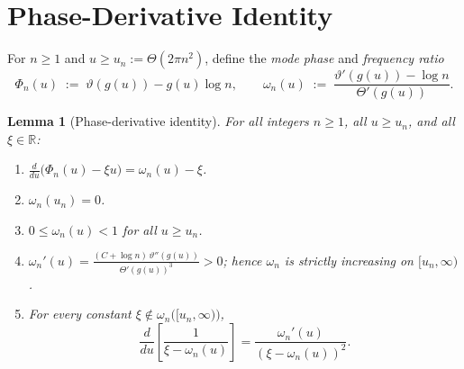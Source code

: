 \documentclass[12pt]{amsart}
\newtheorem{lemma}[theorem]{Lemma}
\theoremstyle{definition}
\theoremstyle{remark}
\begin{document}
\section{Phase-Derivative Identity}

For $n\ge 1$ and $u\ge u_n:=\Theta(2\pi n^2)$, define the
\emph{mode phase} and \emph{frequency ratio}
\begin{equation}\label{eq:Phi-omega}
  \Phi_n(u) \;:=\; \vartheta(g(u))-g(u)\log n,
  \qquad
  \omega_n(u) \;:=\;
  \frac{\vartheta'(g(u))-\log n}{\Theta'(g(u))}.
\end{equation}

\begin{lemma}[Phase-derivative identity]\label{lem:phase}
For all integers $n\ge 1$, all $u\ge u_n$, and all $\xi\in\mathbb{R}$:
\begin{enumerate}
  \item[\textup{(a)}]
    $\displaystyle\frac{d}{du}\bigl(\Phi_n(u)-\xi u\bigr)
    =\omega_n(u)-\xi$.
  \item[\textup{(b)}]
    $\omega_n(u_n)=0$.
  \item[\textup{(c)}]
    $0\le\omega_n(u)<1$ for all $u\ge u_n$.
  \item[\textup{(d)}]
    $\displaystyle\omega_n'(u)
    =\frac{(C+\log n)\,\vartheta''(g(u))}{\Theta'(g(u))^3}>0$;
    hence $\omega_n$ is strictly increasing on $[u_n,\infty)$.
  \item[\textup{(e)}]
    For every constant $\xi\notin\omega_n\!\bigl([u_n,\infty)\bigr)$,
    \[
      \frac{d}{du}\!\left[\frac{1}{\xi-\omega_n(u)}\right]
      =\frac{\omega_n'(u)}{(\xi-\omega_n(u))^2}.
    \]
\end{enumerate}
\end{lemma}
\end{document}
